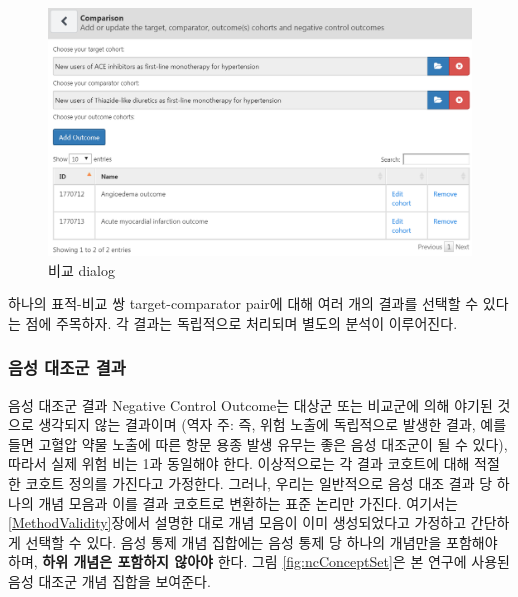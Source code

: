 \documentclass[10.5pt]{book}
\theoremstyle{definition}
\theoremstyle{definition}
\theoremstyle{definition}
\theoremstyle{remark}
\begin{document}
\begin{figure}

{\centering \includegraphics[width=1\linewidth]{images/PopulationLevelEstimation/comparisons} 

}

\caption{비교 dialog}\label{fig:comparisons}
\end{figure}

하나의 표적-비교 쌍 target-comparator pair에 대해 여러 개의 결과를
선택할 수 있다는 점에 주목하자. 각 결과는 독립적으로 처리되며 별도의
분석이 이루어진다.

\subsubsection*{음성 대조군 결과}\label{--}

음성 대조군 결과 Negative Control Outcome는 대상군 또는 비교군에 의해
야기된 것으로 생각되지 않는 결과이며 (역자 주: 즉, 위험 노출에
독립적으로 발생한 결과, 예를 들면 고혈압 약물 노출에 따른 항문 용종 발생
유무는 좋은 음성 대조군이 될 수 있다), 따라서 실제 위험 비는 1과
동일해야 한다. 이상적으로는 각 결과 코호트에 대해 적절한 코호트 정의를
가진다고 가정한다. 그러나, 우리는 일반적으로 음성 대조 결과 당 하나의
개념 모음과 이를 결과 코호트로 변환하는 표준 논리만 가진다. 여기서는
\ref{MethodValidity}장에서 설명한 대로 개념 모음이 이미 생성되었다고
가정하고 간단하게 선택할 수 있다. 음성 통제 개념 집합에는 음성 통제 당
하나의 개념만을 포함해야 하며, \textbf{하위 개념은 포함하지 않아야}
한다. 그림 \ref{fig:ncConceptSet}은 본 연구에 사용된 음성 대조군 개념
집합을 보여준다.
\end{document}
